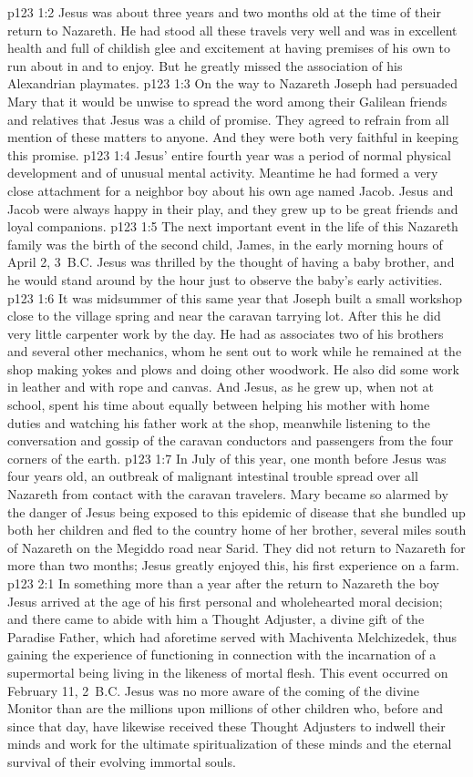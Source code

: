 \vs p123 1:2 Jesus was about three years and two months old at the time of their return to Nazareth. He had stood all these travels very well and was in excellent health and full of childish glee and excitement at having premises of his own to run about in and to enjoy. But he greatly missed the association of his Alexandrian playmates.
\vs p123 1:3 On the way to Nazareth Joseph had persuaded Mary that it would be unwise to spread the word among their Galilean friends and relatives that Jesus was a child of promise. They agreed to refrain from all mention of these matters to anyone. And they were both very faithful in keeping this promise.
\vs p123 1:4 Jesus’ entire fourth year was a period of normal physical development and of unusual mental activity. Meantime he had formed a very close attachment for a neighbor boy about his own age named Jacob. Jesus and Jacob were always happy in their play, and they grew up to be great friends and loyal companions.
\vs p123 1:5 The next important event in the life of this Nazareth family was the birth of the second child, James, in the early morning hours of April 2, 3~B.C. Jesus was thrilled by the thought of having a baby brother, and he would stand around by the hour just to observe the baby’s early activities.
\vs p123 1:6 It was midsummer of this same year that Joseph built a small workshop close to the village spring and near the caravan tarrying lot. After this he did very little carpenter work by the day. He had as associates two of his brothers and several other mechanics, whom he sent out to work while he remained at the shop making yokes and plows and doing other woodwork. He also did some work in leather and with rope and canvas. And Jesus, as he grew up, when not at school, spent his time about equally between helping his mother with home duties and watching his father work at the shop, meanwhile listening to the conversation and gossip of the caravan conductors and passengers from the four corners of the earth.
\vs p123 1:7 In July of this year, one month before Jesus was four years old, an outbreak of malignant intestinal trouble spread over all Nazareth from contact with the caravan travelers. Mary became so alarmed by the danger of Jesus being exposed to this epidemic of disease that she bundled up both her children and fled to the country home of her brother, several miles south of Nazareth on the Megiddo road near Sarid. They did not return to Nazareth for more than two months; Jesus greatly enjoyed this, his first experience on a farm.
\vs p123 2:1 In something more than a year after the return to Nazareth the boy Jesus arrived at the age of his first personal and wholehearted moral decision; and there came to abide with him a Thought Adjuster, a divine gift of the Paradise Father, which had aforetime served with Machiventa Melchizedek, thus gaining the experience of functioning in connection with the incarnation of a supermortal being living in the likeness of mortal flesh. This event occurred on February 11, 2~B.C. Jesus was no more aware of the coming of the divine Monitor than are the millions upon millions of other children who, before and since that day, have likewise received these Thought Adjusters to indwell their minds and work for the ultimate spiritualization of these minds and the eternal survival of their evolving immortal souls.
